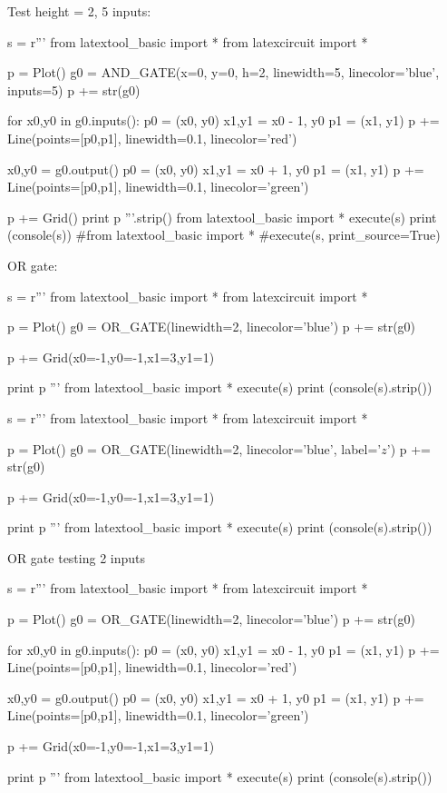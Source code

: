 Test height = 2, 5 inputs:
\begin{python}
s = r'''
from latextool_basic import *
from latexcircuit import *

p = Plot()
g0 = AND_GATE(x=0, y=0, h=2,
              linewidth=5, linecolor='blue', inputs=5)
p += str(g0)

for x0,y0 in g0.inputs():
    p0 = (x0, y0)
    x1,y1 = x0 - 1, y0
    p1 = (x1, y1)
    p += Line(points=[p0,p1], linewidth=0.1, linecolor='red')

x0,y0 = g0.output()
p0 = (x0, y0)
x1,y1 = x0 + 1, y0
p1 = (x1, y1)
p += Line(points=[p0,p1], linewidth=0.1, linecolor='green')

p += Grid()
print p
'''.strip()
from latextool_basic import *
execute(s)
print (console(s))
#from latextool_basic import *
#execute(s, print_source=True)
\end{python}
  


OR gate:
\begin{python}
s = r'''
from latextool_basic import *
from latexcircuit import *

p = Plot()
g0 = OR_GATE(linewidth=2, linecolor='blue')
p += str(g0)

p += Grid(x0=-1,y0=-1,x1=3,y1=1)

print p
'''
from latextool_basic import *
execute(s)
print (console(s).strip())
\end{python}


\begin{python}
s = r'''
from latextool_basic import *
from latexcircuit import *

p = Plot()
g0 = OR_GATE(linewidth=2, linecolor='blue', label='$z$')
p += str(g0)

p += Grid(x0=-1,y0=-1,x1=3,y1=1)

print p
'''
from latextool_basic import *
execute(s)
print (console(s).strip())
\end{python}




\newpage
OR gate testing 2 inputs
\begin{python}
s = r'''
from latextool_basic import *
from latexcircuit import *

p = Plot()
g0 = OR_GATE(linewidth=2, linecolor='blue')
p += str(g0)

for x0,y0 in g0.inputs():
    p0 = (x0, y0)
    x1,y1 = x0 - 1, y0
    p1 = (x1, y1)
    p += Line(points=[p0,p1], linewidth=0.1, linecolor='red')

x0,y0 = g0.output()
p0 = (x0, y0)
x1,y1 = x0 + 1, y0
p1 = (x1, y1)
p += Line(points=[p0,p1], linewidth=0.1, linecolor='green')

p += Grid(x0=-1,y0=-1,x1=3,y1=1)

print p
'''
from latextool_basic import *
execute(s)
print (console(s).strip())
\end{python}


